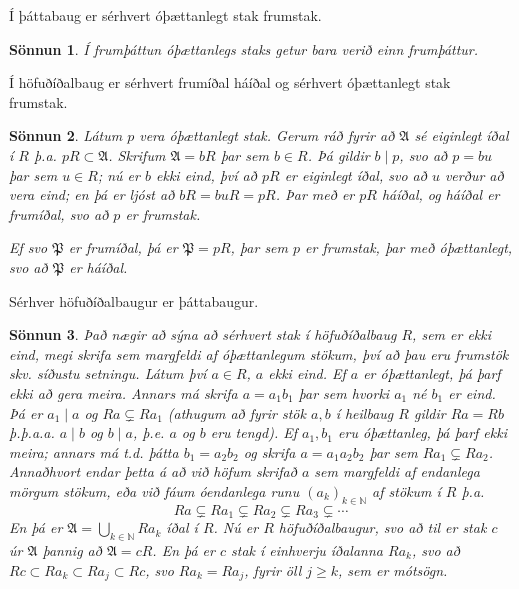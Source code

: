 \documentclass[a4paper,icelandic,11pt]{book}
\theoremstyle{plain}
\newtheorem*{sonnun}{Sönnun}
\newcommand{\N}{\mathbb{N}}
\begin{document}
\begin{fylgisetn}
  Í þáttabaug er sérhvert óþættanlegt stak frumstak.
\end{fylgisetn}
\begin{sonnun}
  Í frumþáttun óþættanlegs staks getur bara verið einn frumþáttur.
\end{sonnun}
\begin{setn}
  Í höfuðíðalbaug er sérhvert frumíðal háíðal og sérhvert óþættanlegt stak
  frumstak.
\end{setn}
\begin{sonnun}
  Látum $p$ vera óþættanlegt stak. Gerum ráð fyrir að $\mathfrak A$ sé eiginlegt
  íðal í $R$ þ.a. $pR\subset\mathfrak A$. Skrifum $\mathfrak A = bR$ þar sem
  $b\in R$. Þá gildir $b\mid p$, svo að $p=bu$  þar sem $u\in R$; nú er $b$ ekki
  eind, því að $pR$ er eiginlegt íðal, svo að $u$ verður að vera eind; en þá er
  ljóst að $bR=buR=pR$. Þar með er $pR$ háíðal, og háíðal er frumíðal, svo að
  $p$ er frumstak.

  Ef svo $\mathfrak P$ er frumíðal, þá er $\mathfrak P = pR$, þar sem $p$ er
  frumstak, þar með óþættanlegt, svo að $\mathfrak P$ er háíðal.
\end{sonnun}
\begin{setn}
  Sérhver höfuðíðalbaugur er þáttabaugur.
\end{setn}
\begin{sonnun}
  Það nægir að sýna að sérhvert stak í höfuðíðalbaug $R$, sem er ekki eind, megi
  skrifa sem margfeldi af \emph{óþættanlegum} stökum, því að þau eru frumstök
  skv. síðustu setningu. Látum því $a\in R$, $a$ ekki eind. Ef $a$ er
  óþættanlegt, þá þarf ekki að gera meira. Annars má skrifa $a=a_1b_1$ þar sem
  hvorki $a_1$ né $b_1$ er eind. Þá er $a_1\mid a$ og $Ra\subsetneq Ra_1$ (athugum
  að fyrir stök $a,b$ í heilbaug $R$ gildir $Ra=Rb$ þ.þ.a.a. $a\mid b$ og
  $b\mid a$,
  þ.e. $a$ og $b$ eru tengd). Ef $a_1,b_1$ eru óþættanleg, þá þarf ekki meira;
  annars má t.d. þátta $b_1 = a_2 b_2$ og skrifa $a=a_1a_2b_2$ þar sem
  $Ra_1\subsetneq Ra_2$. Annaðhvort endar þetta á að við höfum skrifað
  $a$ sem margfeldi af endanlega mörgum stökum, eða við fáum óendanlega runu
  $(a_k)_{k\in\N}$ af stökum í $R$ þ.a. \[
  Ra\subsetneq Ra_1 \subsetneq Ra_2 \subsetneq Ra_3 \subsetneq \cdots
  \]
  En þá er $\mathfrak A=\bigcup_{k\in\N} Ra_k$ íðal í $R$. Nú er $R$
  höfuðíðalbaugur, svo að til er stak $c$ úr $\mathfrak A$ þannig að $\mathfrak
  A = cR$. En þá er $c$ stak í einhverju íðalanna $Ra_k$, svo að 
  $Rc\subset Ra_k \subset Ra_j \subset Rc$, svo  $Ra_k = Ra_j$, fyrir öll
  $j\geq k$, sem er \emph{mótsögn}.
\end{sonnun}
\end{document}
